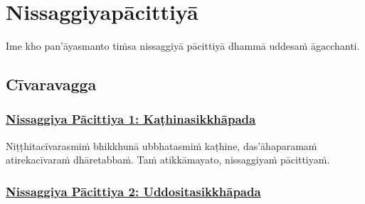 
\section{Nissaggiyapācittiyā}
\label{np}

\begin{intro}
	Ime kho pan'āyasmanto tiṁsa nissaggiyā pācittiyā dhammā uddesaṁ āgacchanti.
\end{intro}

\setsubsecheadstyle{\subsectionFmt}
\subsection{Cīvaravagga}
\label{np-vagga1}

\subsubsection*{\hyperref[forf-exp1]{Nissaggiya Pācittiya 1: Kaṭhinasikkhāpada}}
\label{np1}

Niṭṭhitacīvarasmiṁ\makeatletter\hyperlink{endnote119-appendix}\makeatother{} bhikkhunā ubbhatasmiṁ kaṭhine,\makeatletter\hyperlink{endnote120-appendix}\makeatother{} das'āhaparamaṁ atirekacīvaraṁ dhāretabbaṁ. Taṁ atikkāmayato, nissaggiyaṁ pācittiyaṁ.



\subsubsection*{\hyperref[forf-exp2]{Nissaggiya Pācittiya 2: Uddositasikkhāpada}}
\label{np2}

